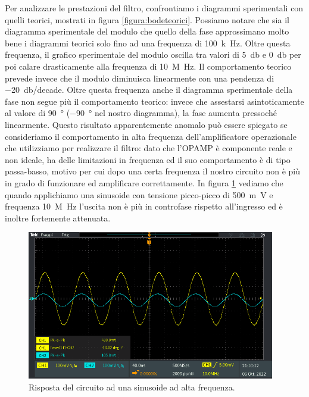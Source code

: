 \documentclass{report}
\begin{document}
Per analizzare le prestazioni del filtro, confrontiamo i diagrammi sperimentali con quelli teorici, mostrati in figura \ref{figura:bodeteorici}. Possiamo notare che sia il diagramma sperimentale del modulo che quello della fase approssimano molto bene i diagrammi teorici solo fino ad una frequenza di \SI{100}{k\hertz}. Oltre questa frequenza, il grafico sperimentale del modulo oscilla tra valori di \SI{5}{\decibel} e \SI{0}{\decibel} per poi calare drasticamente alla frequenza di \SI {10}{M\hertz}. Il comportamento teorico prevede invece che il modulo diminuisca linearmente con una pendenza di \SI{-20}{\decibel}/decade. Oltre questa frequenza anche il diagramma sperimentale della fase non segue più il comportamento teorico: invece che assestarsi asintoticamente al valore di \SI{90}{\degree} (\SI{-90}{\degree} nel nostro diagramma), la fase aumenta pressoché linearmente. Questo risultato apparentemente anomalo può essere spiegato se consideriamo il comportamento in alta frequenza dell'amplificatore operazionale che utilizziamo per realizzare il filtro: dato che l'OPAMP è componente reale e non ideale, ha delle limitazioni in frequenza ed il suo comportamento è di tipo passa-basso, motivo per cui dopo una certa frequenza il nostro circuito non è più in grado di funzionare ed amplificare correttamente. In figura \ref{figura:TEK13} vediamo che quando applichiamo una sinusoide con tensione picco-picco di \SI{500}{m\volt} e frequenza \SI{10}{M\hertz} l'uscita non è più in controfase rispetto all'ingresso ed è inoltre fortemente attenuata.
\begin{figure}[h!]
	\centering
	\includegraphics[height=6.5cm]{immagini/TEK00013}
	\caption{Risposta del circuito ad una sinusoide ad alta frequenza.}
	\label{figura:TEK13}
\end{figure}
\end{document}
